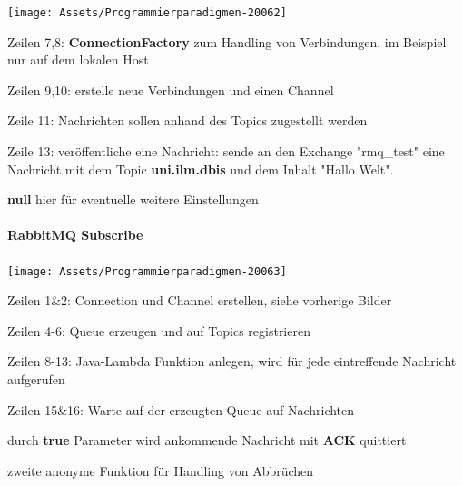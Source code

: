 \documentclass[10pt]{article}
\begin{document}
\begin{center}
  \centering
  \texttt{[image: Assets/Programmierparadigmen-20062]}
\end{center}
\begin{itemize*}
  \item Zeilen 7,8: \textbf{ConnectionFactory} zum Handling von Verbindungen, im Beispiel nur auf dem lokalen Host
  \item Zeilen 9,10: erstelle neue Verbindungen und einen Channel
  \item Zeile 11: Nachrichten sollen anhand des Topics zugestellt werden
  \item Zeile 13: veröffentliche eine Nachricht: sende an den Exchange "rmq\_test" eine Nachricht mit dem Topic \textbf{uni.ilm.dbis} und dem Inhalt "Hallo Welt".
  \begin{itemize*}
    \item \textbf{null} hier für eventuelle weitere Einstellungen
  \end{itemize*}
\end{itemize*}

\paragraph{RabbitMQ Subscribe}

\begin{center}
  \centering
  \texttt{[image: Assets/Programmierparadigmen-20063]}
\end{center}
\begin{itemize*}
  \item Zeilen 1\&2: Connection und Channel erstellen, siehe vorherige Bilder
  \item Zeilen 4-6: Queue erzeugen und auf Topics registrieren
  \item Zeilen 8-13: Java-Lambda Funktion anlegen, wird für jede eintreffende Nachricht aufgerufen
  \item Zeilen 15\&16: Warte auf der erzeugten Queue auf Nachrichten
  \begin{itemize*}
    \item durch \textbf{true} Parameter wird ankommende Nachricht mit \textbf{ACK} quittiert
    \item zweite anonyme Funktion für Handling von Abbrüchen
  \end{itemize*}
\end{itemize*}
\end{document}
